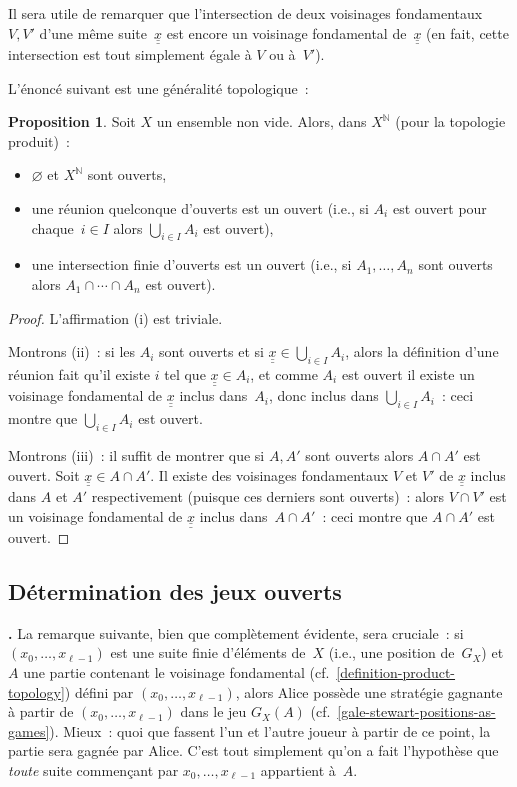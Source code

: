 \documentclass[12pt,a4paper]{article}
\theoremstyle{definition}
\newcommand\thingy{%
\refstepcounter{comcnt}\smallskip\noindent\textbf{\thecomcnt.} }
\newtheorem{prop}[comcnt]{Proposition}
\newcommand{\dblunderline}[1]{\underline{\underline{#1}}}
\begin{document}
Il sera utile de remarquer que l'intersection de deux voisinages
fondamentaux $V,V'$ d'une même suite $\dblunderline{x}$ est encore un
voisinage fondamental de $\dblunderline{x}$ (en fait, cette intersection
est tout simplement égale à $V$ ou à $V'$).

\medbreak

L'énoncé suivant est une généralité topologique :
\begin{prop}
Soit $X$ un ensemble non vide.  Alors, dans $X^{\mathbb{N}}$ (pour la
topologie produit) :
\begin{itemize}
\item[(i)]$\varnothing$ et $X^{\mathbb{N}}$ sont ouverts,
\item[(ii)]une réunion quelconque d'ouverts est un ouvert (i.e., si
  $A_i$ est ouvert pour chaque $i\in I$ alors $\bigcup_{i\in I} A_i$
  est ouvert),
\item[(iii)]une intersection finie d'ouverts est un ouvert (i.e., si
  $A_1,\ldots,A_n$ sont ouverts alors $A_1\cap \cdots \cap A_n$ est
  ouvert).
\end{itemize}
\end{prop}
\begin{proof}
L'affirmation (i) est triviale.

Montrons (ii) : si les $A_i$ sont ouverts et si $\dblunderline{x} \in
\bigcup_{i\in I} A_i$, alors la définition d'une réunion fait qu'il
existe $i$ tel que $\dblunderline{x} \in A_i$, et comme $A_i$ est ouvert
il existe un voisinage fondamental de $\dblunderline{x}$ inclus
dans $A_i$, donc inclus dans $\bigcup_{i\in I} A_i$ : ceci montre que
$\bigcup_{i\in I} A_i$ est ouvert.

Montrons (iii) : il suffit de montrer que si $A, A'$ sont ouverts
alors $A \cap A'$ est ouvert.  Soit $\dblunderline{x} \in A \cap A'$.  Il
existe des voisinages fondamentaux $V$ et $V'$ de $\dblunderline{x}$
inclus dans $A$ et $A'$ respectivement (puisque ces derniers sont
ouverts) : alors $V \cap V'$ est un voisinage fondamental de
$\dblunderline{x}$ inclus dans $A \cap A'$ : ceci montre que $A \cap A'$
est ouvert.
\end{proof}


\subsection{Détermination des jeux ouverts}\label{section-determinacy-of-gale-stewart-games}

\thingy\label{fundamental-neighorhood-terminates-game} La remarque
suivante, bien que complètement évidente, sera cruciale : si
$(x_0,\ldots,x_{\ell-1})$ est une suite finie d'éléments de $X$ (i.e.,
une position de $G_X$) et $A$ une partie contenant le voisinage
fondamental (cf. \ref{definition-product-topology}) défini par
$(x_0,\ldots,x_{\ell-1})$, alors Alice possède une stratégie gagnante
à partir de $(x_0,\ldots,x_{\ell-1})$ dans le jeu $G_X(A)$
(cf. \ref{gale-stewart-positions-as-games}).  Mieux : quoi que fassent
l'un et l'autre joueur à partir de ce point, la partie sera gagnée par
Alice.  C'est tout simplement qu'on a fait l'hypothèse que
\emph{toute} suite commençant par $x_0,\ldots,x_{\ell-1}$ appartient
à $A$.
\end{document}
